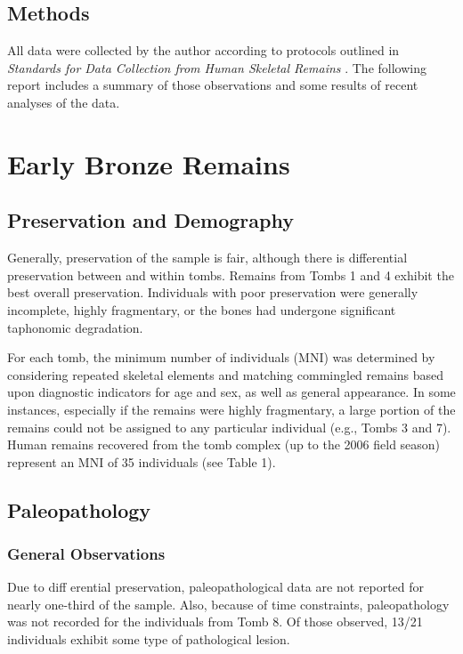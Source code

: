 \documentclass[]{book}
\begin{document}
\section{Methods}\label{methods}

All data were collected by the author according to protocols outlined in
\emph{Standards for Data Collection from Human Skeletal Remains}
\citep{standards1994}. The following report includes a summary of those
observations and some results of recent analyses of the data.

\chapter{Early Bronze Remains}\label{earlybronze}

\section{Preservation and Demography}\label{preservation-and-demography}

Generally, preservation of the sample is fair, although there is
differential preservation between and within tombs. Remains from Tombs 1
and 4 exhibit the best overall preservation. Individuals with poor
preservation were generally incomplete, highly fragmentary, or the bones
had undergone significant taphonomic degradation.

For each tomb, the minimum number of individuals (MNI) was determined by
considering repeated skeletal elements and matching commingled remains
based upon diagnostic indicators for age and sex, as well as general
appearance. In some instances, especially if the remains were highly
fragmentary, a large portion of the remains could not be assigned to any
particular individual (e.g., Tombs 3 and 7). Human remains recovered
from the tomb complex (up to the 2006 field season) represent an MNI of
35 individuals (see Table 1).

\section{Paleopathology}\label{paleopathology}

\subsection{General Observations}\label{general-observations}

Due to diff erential preservation, paleopathological data are not
reported for nearly one-third of the sample. Also, because of time
constraints, paleopathology was not recorded for the individuals from
Tomb 8. Of those observed, 13/21 individuals exhibit some type of
pathological lesion.
\end{document}
